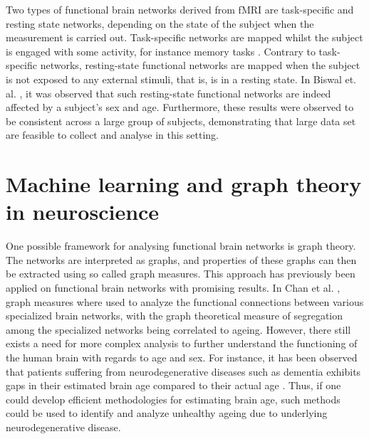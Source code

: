 Two types of functional brain networks derived from fMRI are task-specific and resting state networks, depending on the state of the subject when the measurement is carried out. Task-specific networks are mapped whilst the subject is engaged with some activity, for instance memory tasks \cite{grady}. Contrary to task-specific networks, resting-state functional networks are mapped when the subject is not exposed to any external stimuli, that is, is in a resting state. In Biswal et. al. \cite{biswal}, it was observed that such resting-state functional networks are indeed affected by a subject's sex and age. Furthermore, these results were observed to be consistent across a large group of subjects, demonstrating that large data set are feasible to collect and analyse in this setting.

\section{Machine learning and graph theory in neuroscience}

One possible framework for analysing functional brain networks is graph theory. The networks are interpreted as graphs, and properties of these graphs can then be extracted using so called graph measures. This approach has previously been applied on functional brain networks with promising results. In Chan et al. \cite{chan}, graph measures where used to analyze the functional connections between various specialized brain networks, with the graph theoretical measure of segregation among the specialized networks being correlated to ageing. However, there still exists a need for more complex analysis to further understand the functioning of the human brain with regards to age and sex. For instance, it has been observed that patients suffering from neurodegenerative diseases such as dementia exhibits gaps in their estimated brain age compared to their actual age \cite{kaufmann}. Thus, if one could develop efficient methodologies for estimating brain age, such methods could be used to identify and analyze unhealthy ageing due to underlying neurodegenerative disease. 


